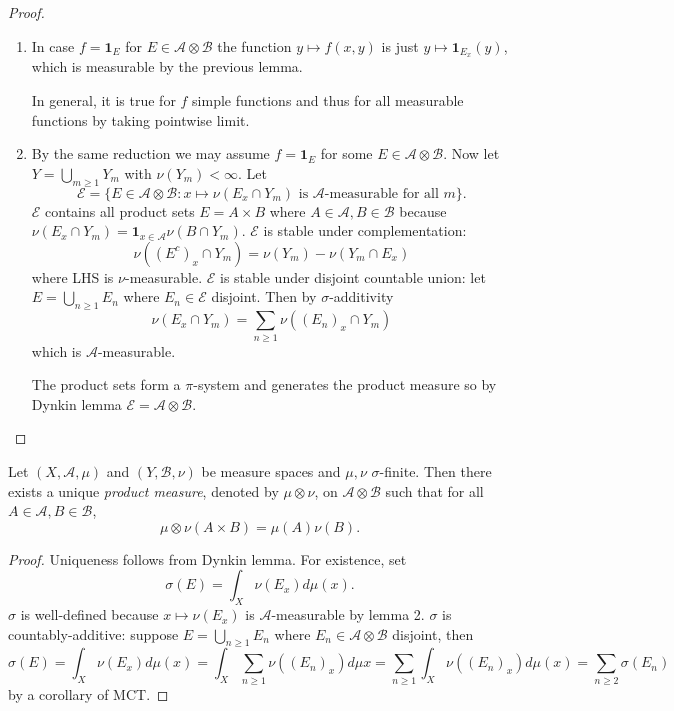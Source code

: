 \documentclass[a4paper]{article}
\begin{document}
\begin{proof}\leavevmode
  \begin{enumerate}
  \item In case \(f = \mathbf 1_E\) for \(E \in \mathcal A \otimes \mathcal B\) the function \(y \mapsto f(x, y)\) is just \(y \mapsto \mathbf 1_{E_x}(y)\), which is measurable by the previous lemma.

    In general, it is true for \(f\) simple functions and thus for all measurable functions by taking pointwise limit.
  \item By the same reduction we may assume \(f = \mathbf 1_E\) for some \(E \in \mathcal A \otimes \mathcal B\). Now let \(Y = \bigcup_{m \geq 1} Y_m\) with \(\nu(Y_m) < \infty\). Let
    \[
      \mathcal E = \{E \in \mathcal A \otimes \mathcal B: x \mapsto \nu(E_x \cap Y_m) \text{ is \(\mathcal A\)-measurable for all } m\}.
    \]
    \(\mathcal E\) contains all product sets \(E = A \times B\) where \(A \in \mathcal A, B \in \mathcal B\) because \(\nu(E_x \cap Y_m) = \mathbf 1_{x \in \mathcal A} \nu(B \cap Y_m)\). \(\mathcal E\) is stable under complementation:
    \[
      \nu((E^c)_x \cap Y_m) = \nu(Y_m) - \nu(Y_m \cap E_x)
    \]
    where LHS is \(\nu\)-measurable. \(\mathcal E\) is stable under disjoint countable union: let \(E = \bigcup_{n \geq 1} E_n\) where \(E_n \in \mathcal E\) disjoint. Then by \(\sigma\)-additivity
    \[
      \nu(E_x \cap Y_m) = \sum_{n \geq 1} \nu((E_n)_x \cap Y_m)
    \]
    which is \(\mathcal A\)-measurable.

    The product sets form a \(\pi\)-system and generates the product measure so by Dynkin lemma \(\mathcal E = \mathcal A \otimes \mathcal B\).
  \end{enumerate}
\end{proof}

\begin{definition}
  Let \((X, \mathcal A, \mu)\) and \((Y, \mathcal B, \nu)\) be measure spaces and \(\mu, \nu\) \(\sigma\)-finite. Then there exists a unique \emph{product measure}, denoted by \(\mu \otimes \nu\), on \(\mathcal A \otimes \mathcal B\) such that for all \(A \in \mathcal A, B \in \mathcal B\),
  \[
    \mu \otimes \nu (A \times B) = \mu(A)\nu(B).
  \]
\end{definition}

\begin{proof}
  Uniqueness follows from Dynkin lemma. For existence, set
  \[
    \sigma(E) = \int_X \nu(E_x) d\mu(x).
  \]
  \(\sigma\) is well-defined because \(x \mapsto \nu(E_x)\) is \(\mathcal A\)-measurable by lemma 2. \(\sigma\) is countably-additive: suppose \(E = \bigcup_{n \geq 1} E_n\) where \(E_n \in \mathcal A \otimes \mathcal B\) disjoint, then
  \[
    \sigma(E)
    = \int_X \nu(E_x) d\mu(x)
    = \int_X \sum_{n \geq 1} \nu((E_n)_x) d\mu x
    = \sum_{n \geq 1} \int_X \nu((E_n)_x) d\mu(x)
    = \sum_{n \geq 2} \sigma(E_n)
  \]
  by a corollary of MCT.
\end{proof}
\end{document}
